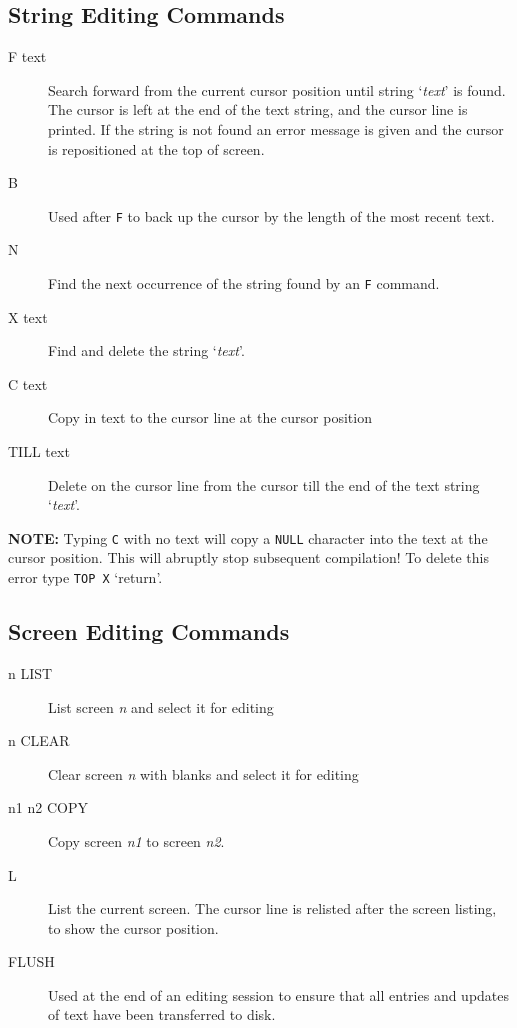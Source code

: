 \documentclass{article}
\newcommand{\n}{\textit{n}}
\begin{document}
\begin{multicols*}{2}[]
	\subsection{String Editing Commands}
	\begin{description}
		\item[F text]
			Search forward from the current cursor position
			until string `\textit{text}' is found. The cursor is left at
			the end of the text string, and the cursor line is printed.
			If the string is not found an error message is given
			and the cursor is repositioned at the top of screen.
		\item[B]
			Used after \verb|F| to back up the cursor by the length
			of the most recent text.
		\item[N]
			Find the next occurrence of the string found by an
			\verb|F| command.
		\item[X text]
			Find and delete the string `\textit{text}'.
		\item[C text]
			Copy in text to the cursor line at the cursor position
		\item[TILL text]
			Delete on the cursor line from the cursor till the
			end of the text string `\textit{text}'.
	\end{description}
	\textbf{NOTE:} Typing \verb|C| with no text will copy a \verb|NULL| character
	into the text at the cursor position. This will abruptly stop subsequent
	compilation! To delete this error type \verb|TOP X| `return'.

	\subsection{Screen Editing Commands}
	\begin{description}
		\item[n LIST]
			List screen \n{} and select it for editing
		\item[n CLEAR]
			Clear screen \n{} with blanks and select it for editing
		\item[n1 n2 COPY]
			Copy screen \textit{n1} to screen \textit{n2}.
		\item[L]
			List the current screen. The cursor line is relisted
			after the screen listing, to show the cursor position.
		\item[FLUSH]
			Used at the end of an editing session to ensure that
			all entries and updates of text have been transferred
			to disk.
	\end{description}


\end{multicols*}
\end{document}
